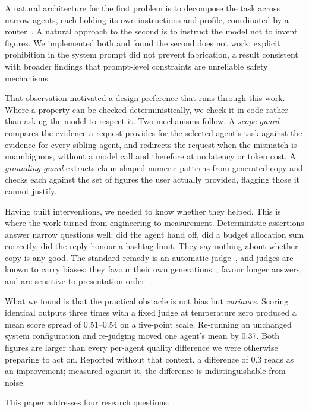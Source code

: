 \documentclass[9pt,twocolumn]{extarticle}
\begin{document}
A natural architecture for the first problem is to decompose the task across
narrow agents, each holding its own instructions and profile, coordinated by a
router~\cite{wu2023autogen, langgraph2024}. A natural approach to the second is
to instruct the model not to invent figures. We implemented both and found the
second does not work: explicit prohibition in the system prompt did not prevent
fabrication, a result consistent with broader findings that prompt-level
constraints are unreliable safety mechanisms~\cite{rebedea2023nemo}.

That observation motivated a design preference that runs through this work.
Where a property can be checked deterministically, we check it in code rather
than asking the model to respect it. Two mechanisms follow. A \textit{scope
guard} compares the evidence a request provides for the selected agent's task
against the evidence for every sibling agent, and redirects the request when
the mismatch is unambiguous, without a model call and therefore at no latency
or token cost. A \textit{grounding guard} extracts claim-shaped numeric
patterns from generated copy and checks each against the set of figures the
user actually provided, flagging those it cannot justify.

Having built interventions, we needed to know whether they helped. This is
where the work turned from engineering to measurement. Deterministic assertions
answer narrow questions well: did the agent hand off, did a budget allocation
sum correctly, did the reply honour a hashtag limit. They say nothing about
whether copy is any good. The standard remedy is an automatic
judge~\cite{zheng2023judging, liu2023geval}, and judges are known to carry
biases: they favour their own generations~\cite{panickssery2024selfpref},
favour longer answers, and are sensitive to presentation
order~\cite{wang2023fair, koo2023benchmarking}.

What we found is that the practical obstacle is not bias but \textit{variance}.
Scoring identical outputs three times with a fixed judge at temperature zero
produced a mean score spread of 0.51--0.54 on a five-point scale. Re-running an
unchanged system configuration and re-judging moved one agent's mean by 0.37.
Both figures are larger than every per-agent quality difference we were
otherwise preparing to act on. Reported without that context, a difference of
0.3 reads as an improvement; measured against it, the difference is
indistinguishable from noise.

This paper addresses four research questions.
\end{document}
